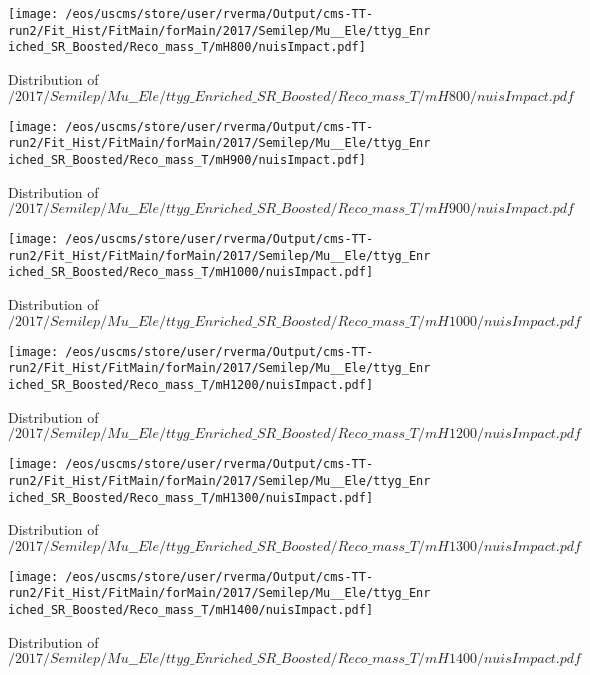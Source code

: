 \begin{figure}
\centering
\texttt{[image: /eos/uscms/store/user/rverma/Output/cms-TT-run2/Fit\_Hist/FitMain/forMain/2017/Semilep/Mu\_\_Ele/ttyg\_Enriched\_SR\_Boosted/Reco\_mass\_T/mH800/nuisImpact.pdf]}
\caption{Distribution of $/2017/Semilep/Mu\_\_Ele/ttyg\_Enriched\_SR\_Boosted/Reco\_mass\_T/mH800/nuisImpact.pdf$}
\end{figure}

\begin{figure}
\centering
\texttt{[image: /eos/uscms/store/user/rverma/Output/cms-TT-run2/Fit\_Hist/FitMain/forMain/2017/Semilep/Mu\_\_Ele/ttyg\_Enriched\_SR\_Boosted/Reco\_mass\_T/mH900/nuisImpact.pdf]}
\caption{Distribution of $/2017/Semilep/Mu\_\_Ele/ttyg\_Enriched\_SR\_Boosted/Reco\_mass\_T/mH900/nuisImpact.pdf$}
\end{figure}

\begin{figure}
\centering
\texttt{[image: /eos/uscms/store/user/rverma/Output/cms-TT-run2/Fit\_Hist/FitMain/forMain/2017/Semilep/Mu\_\_Ele/ttyg\_Enriched\_SR\_Boosted/Reco\_mass\_T/mH1000/nuisImpact.pdf]}
\caption{Distribution of $/2017/Semilep/Mu\_\_Ele/ttyg\_Enriched\_SR\_Boosted/Reco\_mass\_T/mH1000/nuisImpact.pdf$}
\end{figure}

\begin{figure}
\centering
\texttt{[image: /eos/uscms/store/user/rverma/Output/cms-TT-run2/Fit\_Hist/FitMain/forMain/2017/Semilep/Mu\_\_Ele/ttyg\_Enriched\_SR\_Boosted/Reco\_mass\_T/mH1200/nuisImpact.pdf]}
\caption{Distribution of $/2017/Semilep/Mu\_\_Ele/ttyg\_Enriched\_SR\_Boosted/Reco\_mass\_T/mH1200/nuisImpact.pdf$}
\end{figure}

\begin{figure}
\centering
\texttt{[image: /eos/uscms/store/user/rverma/Output/cms-TT-run2/Fit\_Hist/FitMain/forMain/2017/Semilep/Mu\_\_Ele/ttyg\_Enriched\_SR\_Boosted/Reco\_mass\_T/mH1300/nuisImpact.pdf]}
\caption{Distribution of $/2017/Semilep/Mu\_\_Ele/ttyg\_Enriched\_SR\_Boosted/Reco\_mass\_T/mH1300/nuisImpact.pdf$}
\end{figure}

\begin{figure}
\centering
\texttt{[image: /eos/uscms/store/user/rverma/Output/cms-TT-run2/Fit\_Hist/FitMain/forMain/2017/Semilep/Mu\_\_Ele/ttyg\_Enriched\_SR\_Boosted/Reco\_mass\_T/mH1400/nuisImpact.pdf]}
\caption{Distribution of $/2017/Semilep/Mu\_\_Ele/ttyg\_Enriched\_SR\_Boosted/Reco\_mass\_T/mH1400/nuisImpact.pdf$}
\end{figure}

